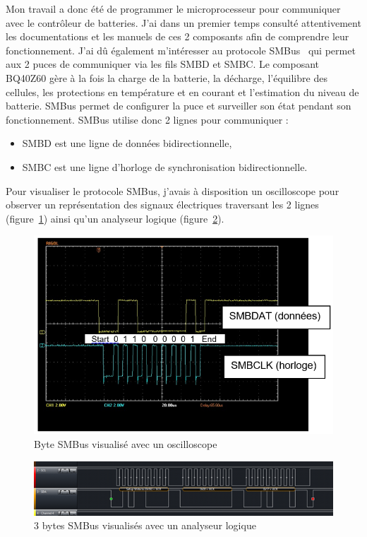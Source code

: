 \documentclass[a4paper, 12pt, sffamily]{report}
\begin{document}
Mon travail a donc été de programmer le microprocesseur pour communiquer avec le contrôleur de batteries. J’ai dans un premier temps consulté attentivement les documentations et les manuels de ces 2 composants afin de comprendre leur fonctionnement. J’ai dû également m’intéresser au protocole SMBus~\cite{smbus_spec} qui permet aux 2 puces de communiquer via les fils SMBD et SMBC.
Le composant BQ40Z60 gère à la fois la charge de la batterie, la décharge, l’équilibre des cellules, les protections en température et en courant et l’estimation du niveau de batterie. SMBus permet de configurer la puce et surveiller son état pendant son fonctionnement.
SMBus utilise donc 2 lignes pour communiquer :
\begin{itemize} %
\item SMBD est une ligne de données bidirectionnelle,
\item SMBC est une ligne d'horloge de synchronisation bidirectionnelle.
\end{itemize}

Pour visualiser le protocole SMBus, j’avais à disposition un oscilloscope pour observer un représentation des signaux électriques traversant les 2 lignes (figure~\ref{fig:SMBus_oscilloscope}) ainsi qu’un analyseur logique (figure~\ref{fig:SMBus_logic_analyser}).

\begin{figure}[H]
\centering
\includegraphics[scale=0.6]{figures/screenshots/SMBus_oscilloscope.png}
\caption{Byte SMBus visualisé avec un oscilloscope}
\label{fig:SMBus_oscilloscope}
\end{figure}

\begin{figure}[H]
\centering
\includegraphics[scale=0.9]{figures/screenshots/SMBus_logic_analyser.png}
\caption{3 bytes SMBus visualisés avec un analyseur logique}
\label{fig:SMBus_logic_analyser}
\end{figure}
\end{document}
